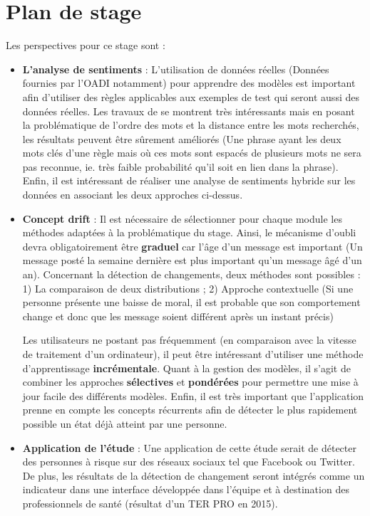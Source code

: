 \documentclass[utf8]{stageM2R} %
\theoremstyle{remark}
\renewcommand{\emph}{\textbf}
\begin{document}

\section{Plan de stage}
Les perspectives pour ce stage sont :
\begin{itemize}
\item \emph{L'analyse de sentiments} : L'utilisation de données réelles (Données fournies par l'OADI notamment) pour apprendre des modèles est important afin d'utiliser des règles applicables aux exemples de test qui seront aussi des données réelles. Les travaux de \cite{Silva2011} se montrent très intéressants mais en posant la problématique de l'ordre des mots et la distance entre les mots recherchés, les résultats peuvent être sûrement améliorés (Une phrase ayant les deux mots clés d'une règle mais où ces mots sont espacés de plusieurs mots ne sera pas reconnue, ie. très faible probabilité qu'il soit en lien dans la phrase). Enfin, il est intéressant de réaliser une analyse de sentiments hybride sur les données en associant les deux approches ci-dessus.

\item \emph{Concept drift} : Il est nécessaire de sélectionner pour chaque module les méthodes adaptées à la problématique du stage. Ainsi, le mécanisme d'oubli devra obligatoirement être \emph{graduel} car l'âge d'un message est important (Un message posté la semaine dernière est plus important qu'un message âgé d'un an). Concernant la détection de changements, deux méthodes sont possibles : 1) La comparaison de deux distributions ; 2) Approche contextuelle (Si une personne présente une baisse de moral, il est probable que son comportement change et donc que les message soient différent après un instant précis)

Les utilisateurs ne postant pas fréquemment (en comparaison avec la vitesse de traitement d'un ordinateur), il peut être intéressant d'utiliser une méthode d'apprentissage \emph{incrémentale}. Quant à la gestion des modèles, il s'agit de combiner les approches \emph{sélectives} et \emph{pondérées} pour permettre une mise à jour facile des différents modèles.
Enfin, il est très important que l'application prenne en compte les concepts récurrents afin de détecter le plus rapidement possible un état déjà atteint par une personne.

\item \emph{Application de l'étude} : Une application de cette étude serait de détecter des personnes à risque sur des réseaux sociaux tel que Facebook ou Twitter. De plus, les résultats de la détection de changement seront intégrés comme un indicateur dans une interface développée dans l'équipe et à destination des professionnels de santé (résultat d'un TER PRO en 2015).
\end{itemize}




\end{document}

